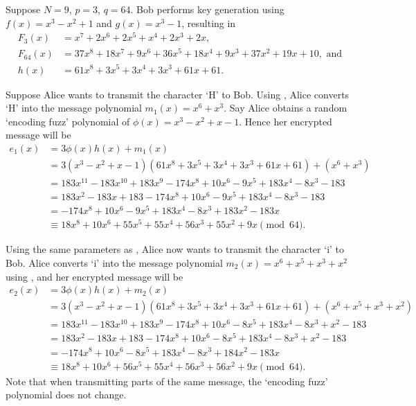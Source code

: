 \begin{example}\label{example-ntru-case-1}
    Suppose $N = 9$, $p = 3$, $q = 64$. Bob performs key generation using $f(x) = x^3 - x^2 + 1$ and $g(x) = x^3 - 1$, resulting in
    \begin{align*}
        F_3(x) &= x^7 + 2x^6 + 2x^5 +x^4 + 2x^3 + 2x,\\
        F_{64}(x) &= 37x^8 + 18x^7 + 9x^6 + 36x^5 + 18x^4 + 9x^3 + 37x^2 + 19x + 10, \text{ and}\\
        h(x) &= 61x^8 + 3x^5 + 3x^4 + 3x^3 + 61x + 61.
    \end{align*}

    Suppose Alice wants to transmit the character `H' to Bob. Using , Alice converts `H' into the message polynomial $m_1(x) = x^6 + x^3$. Say Alice obtains a random `encoding fuzz' polynomial of $\phi(x) = x^{3} - x^{2} + x - 1$. Hence her encrypted message will be
    \begin{align*}
        e_1(x) &= 3\phi(x)h(x) + m_1(x)\\
        &= 3(x^3 -x^2 +x - 1)(61x^8 + 3x^5 + 3x^4 + 3x^3 + 61x + 61) + (x^6 + x^3)\\
        &= 183x^{11} - 183x^{10} + 183x^9 - 174x^8 + 10x^6 - 9x^5 + 183x^4 - 8x^3 - 183\\
        &= 183x^2 - 183x + 183 - 174x^8 + 10x^6 - 9x^5 + 183x^4 - 8x^3 - 183\\
        &= -174x^8 + 10x^6 - 9x^5 + 183x^4 - 8x^3 + 183x^2 - 183x\\
        &\equiv 18x^8 + 10x^6 + 55x^5 + 55x^4 + 56x^3 + 55x^2 + 9x \pmod{64}.
    \end{align*}
\end{example}

\begin{example}\label{example-ntru-case-2}
    Using the same parameters as , Alice now wants to transmit the character `i' to Bob. Alice converts `i' into the message polynomial $m_2(x) = x^6 + x^5 + x^3 + x^2$ using , and her encrypted message will be
    \begin{align*}
        e_2(x) &= 3\phi(x)h(x) + m_2(x)\\
        &= 3(x^3 - x^2 + x - 1)(61x^8 + 3x^5 + 3x^4 + 3x^3 + 61x + 61) + (x^6 + x^5 + x^3 + x^2)\\
        &= 183x^{11} - 183x^{10} + 183x^9 - 174x^8 + 10x^6 - 8x^5 + 183x^4 - 8x^3 + x^2 - 183\\
        &= 183x^2 - 183x + 183 - 174x^8 + 10x^6 - 8x^5 + 183x^4 - 8x^3 + x^2 - 183\\
        &= -174x^8 + 10x^6 - 8x^5 + 183x^4 - 8x^3 + 184x^2 - 183x\\
        &\equiv 18x^8 + 10x^6 + 56x^5 + 55x^4 + 56x^3 + 56x^2 + 9x \pmod{64}.
    \end{align*}
    Note that when transmitting parts of the same message, the `encoding fuzz' polynomial does not change.
\end{example}

